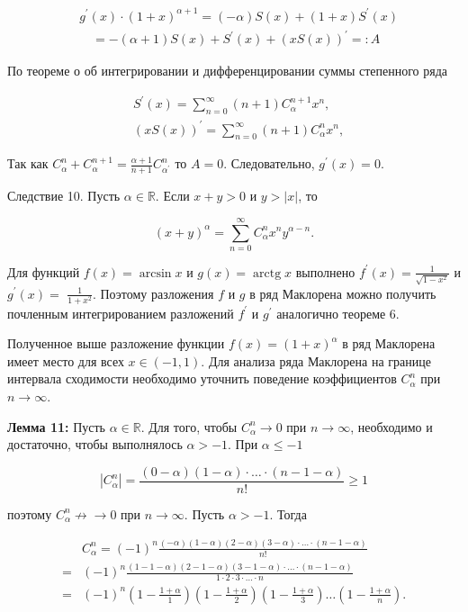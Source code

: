 \documentclass[a4paper,12pt]{article} %
\begin{document}
$$
\begin{aligned}
& g^{\prime}(x) \cdot(1+x)^{\alpha+1}=(-\alpha) S(x)+(1+x) S^{\prime}(x) \\
& \quad=-(\alpha+1) S(x)+S^{\prime}(x)+(x S(x))^{\prime}=: A
\end{aligned}
$$

По теореме о об интегрировании и дифференцировании суммы степенного ряда

$$
\begin{aligned}
& S^{\prime}(x)=\sum_{n=0}^{\infty}(n+1) C_{\alpha}^{n+1} x^{n}, \\
& (x S(x))^{\prime}=\sum_{n=0}^{\infty}(n+1) C_{\alpha}^{n} x^{n},
\end{aligned}
$$

Так как $C_{\alpha}^{n}+C_{\alpha}^{n+1}=\frac{\alpha+1}{n+1} C_{\alpha^{\prime}}^{n}$ то $A=0$. Следовательно, $g^{\prime}(x)=0$.

Следствие 10. Пусть $\alpha \in \mathbb{R}$. Если $x+y>0$ и $y>|x|$, то

$$
(x+y)^{\alpha}=\sum_{n=0}^{\infty} C_{\alpha}^{n} x^{n} y^{\alpha-n} .
$$

Для функций $f(x)=\arcsin x$ и $g(x)=\operatorname{arctg} x$ выполнено $f^{\prime}(x)=\frac{1}{\sqrt{1-x^{2}}}$ и $g^{\prime}(x)=$ $\frac{1}{1+x^{2}}$. Поэтому разложения $f$ и $g$ в ряд Маклорена можно получить почленным интегрированием разложений $f^{\prime}$ и $g^{\prime}$ аналогично теореме 6.

Полученное выше разложение функции $f(x)=(1+x)^{\alpha}$ в ряд Маклорена имеет место для всех $x \in(-1,1)$. Для анализа ряда Маклорена на границе интервала сходимости необходимо уточнить поведение коэффициентов $C_{\alpha}^{n}$ при $n \rightarrow \infty$.

\textbf{Лемма 11:} Пусть $\alpha \in \mathbb{R}$. Для того, чтобы $C_{\alpha}^{n} \rightarrow 0$ при $n \rightarrow \infty$, необходимо и достаточно, чтобы выполнялось $\alpha>-1$. При $\alpha \leq-1$

$$
\left|C_{\alpha}^{n}\right|=\frac{(0-\alpha)(1-\alpha) \cdot \ldots \cdot(n-1-\alpha)}{n !} \geq 1
$$

поэтому $C_{\alpha}^{n} \nrightarrow \rightarrow 0$ при $n \rightarrow \infty$. Пусть $\alpha>-1$. Тогда

$$
\begin{aligned}
& C_{\alpha}^{n}=(-1)^{n} \frac{(-\alpha)(1-\alpha)(2-\alpha)(3-\alpha) \cdot \ldots \cdot(n-1-\alpha)}{n !} \\
= & (-1)^{n} \frac{(1-1-\alpha)(2-1-\alpha)(3-1-\alpha) \cdot \ldots \cdot(n-1-\alpha)}{1 \cdot 2 \cdot 3 \cdot \ldots \cdot n} \\
= & (-1)^{n}\left(1-\frac{1+\alpha}{1}\right)\left(1-\frac{1+\alpha}{2}\right)\left(1-\frac{1+\alpha}{3}\right) \ldots\left(1-\frac{1+\alpha}{n}\right) .
\end{aligned}
$$
\end{document}
